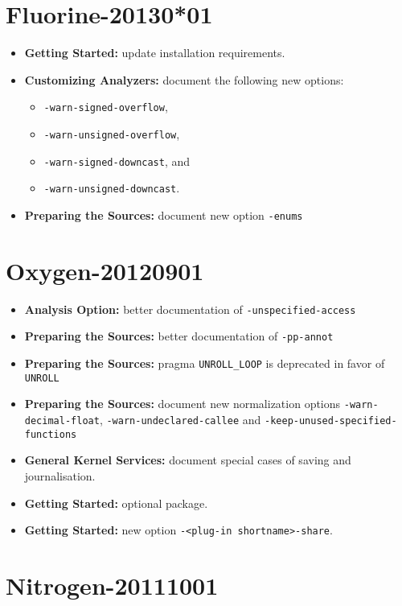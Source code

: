 \section*{Fluorine-20130*01}
\begin{itemize}
\item \textbf{Getting Started:} update installation requirements.
\item \textbf{Customizing Analyzers:} document the following new options:
  \begin{itemize}
  \item \texttt{-warn-signed-overflow},
  \item \texttt{-warn-unsigned-overflow},
  \item \texttt{-warn-signed-downcast}, and
  \item \texttt{-warn-unsigned-downcast}.
  \end{itemize}
\item \textbf{Preparing the Sources:} document new option \texttt{-enums}
\end{itemize}

\section*{Oxygen-20120901}

\begin{itemize}
\item \textbf{Analysis Option:} better documentation of
\texttt{-unspecified-access}
\item \textbf{Preparing the Sources:} better documentation of \texttt{-pp-annot}
\item \textbf{Preparing the Sources:} pragma \texttt{UNROLL\_LOOP} is
deprecated in favor of \texttt{UNROLL}
\item \textbf{Preparing the Sources:} document new normalization options
  \texttt{-warn-decimal-float}, \texttt{-warn-undeclared-callee} and
  \texttt{-keep-unused-specified-functions}
\item \textbf{General Kernel Services:} document special cases of saving and
  journalisation.
\item \textbf{Getting Started:} optional  package.
\item \textbf{Getting Started:} new option \texttt{-<plug-in shortname>-share}.
\end{itemize}

\section*{Nitrogen-20111001}

